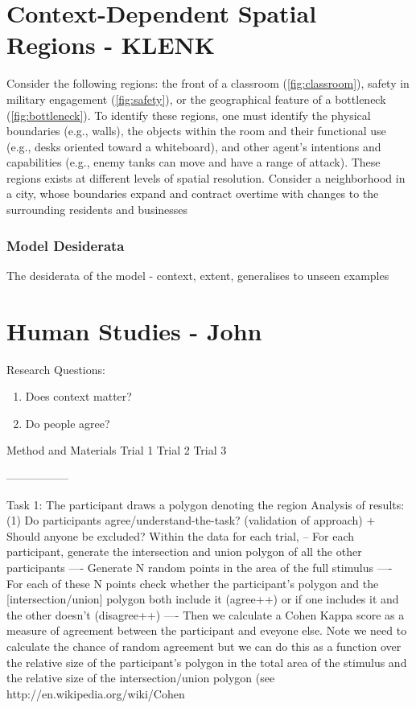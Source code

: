 \documentclass[11pt,letterpaper]{article}
\begin{document}
\section{Context-Dependent Spatial Regions - KLENK}
Consider the following regions: the front of a classroom (\ref{fig:classroom}), safety in military engagement (\ref{fig:safety}), or the geographical feature of a bottleneck (\ref{fig:bottleneck}).  To identify these regions, one must identify the physical boundaries (e.g., walls), the objects within the room and their functional use (e.g., desks oriented toward a whiteboard), and other agent's intentions and capabilities (e.g., enemy tanks can move and have a range of attack).  These regions exists at different levels of spatial resolution.  Consider a neighborhood in a city, whose boundaries expand and contract overtime with changes to the surrounding residents and businesses


\subsubsection{Model Desiderata} %
\label{sec:desiderata}

The desiderata of the model - context, extent, generalises to unseen examples


\section{Human Studies - John}
Research Questions: 
\begin{enumerate}
	\item Does context matter?
	\item Do people agree? 
\end{enumerate}

Method and Materials 
Trial 1
Trial 2
Trial 3

-----------------

Task 1: The participant draws a polygon denoting the region
Analysis of results:
(1) Do participants agree/understand-the-task? (validation of approach) + Should anyone be excluded?
Within the data for each trial,
-- For each participant, generate the intersection and union polygon of all the other participants
---- Generate N random points in the area of the full stimulus
---- For each of these N points check whether the participant's polygon and the [intersection/union] polygon both include it (agree++) or if one includes it and the other doesn't (disagree++)
---- Then we calculate a Cohen Kappa score as a measure of agreement between the participant and eveyone else. Note we need to calculate the chance of random agreement but we can do this as a function over the relative size of the participant's polygon in the total area of the stimulus and the relative size of the intersection/union polygon
(see http://en.wikipedia.org/wiki/Cohen%
\end{document}
